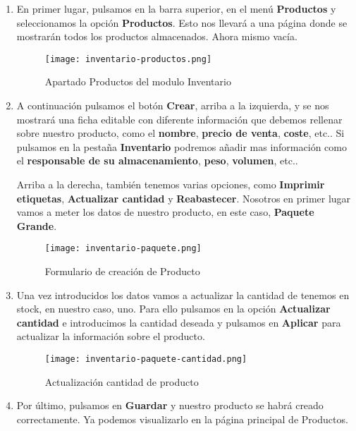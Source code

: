 \begin{enumerate}
    \item En primer lugar, pulsamos en la barra superior, en el menú \textbf{Productos} y seleccionamos la opción \textbf{Productos}. Esto nos llevará a una página donde se mostrarán todos los productos almacenados. Ahora mismo vacía.

    \begin{figure}[ht]
        \centering
        \texttt{[image: inventario-productos.png]}
        \caption{Apartado Productos del modulo Inventario}
    \end{figure}

    \item A continuación pulsamos el botón \textbf{Crear}, arriba a la izquierda, y se nos mostrará una ficha editable con diferente información que debemos rellenar sobre nuestro producto, como el \textbf{nombre}, \textbf{precio de venta}, \textbf{coste}, etc.. Si pulsamos en la pestaña \textbf{Inventario} podremos añadir mas información como el \textbf{responsable de su almacenamiento}, \textbf{peso}, \textbf{volumen}, etc..

    Arriba a la derecha, también tenemos varias opciones, como \textbf{Imprimir etiquetas}, \textbf{Actualizar cantidad} y \textbf{Reabastecer}. Nosotros en primer lugar vamos a meter los datos de nuestro producto, en este caso, \textbf{Paquete Grande}.

    \begin{figure}[ht]
        \centering
        \texttt{[image: inventario-paquete.png]}
        \caption{Formulario de creación de Producto}
    \end{figure}

    \vspace{5ex}

    \item Una vez introducidos los datos vamos a actualizar la cantidad de tenemos en stock, en nuestro caso, uno. Para ello pulsamos en la opción \textbf{Actualizar cantidad} e introducimos la cantidad deseada y pulsamos en \textbf{Aplicar} para actualizar la información sobre el producto.

    \begin{figure}[ht]
        \centering
        \texttt{[image: inventario-paquete-cantidad.png]}
        \caption{Actualización cantidad de producto}
    \end{figure}

    \item Por último, pulsamos en \textbf{Guardar} y nuestro producto se habrá creado correctamente. Ya podemos visualizarlo en la página principal de Productos.
\end{enumerate}

